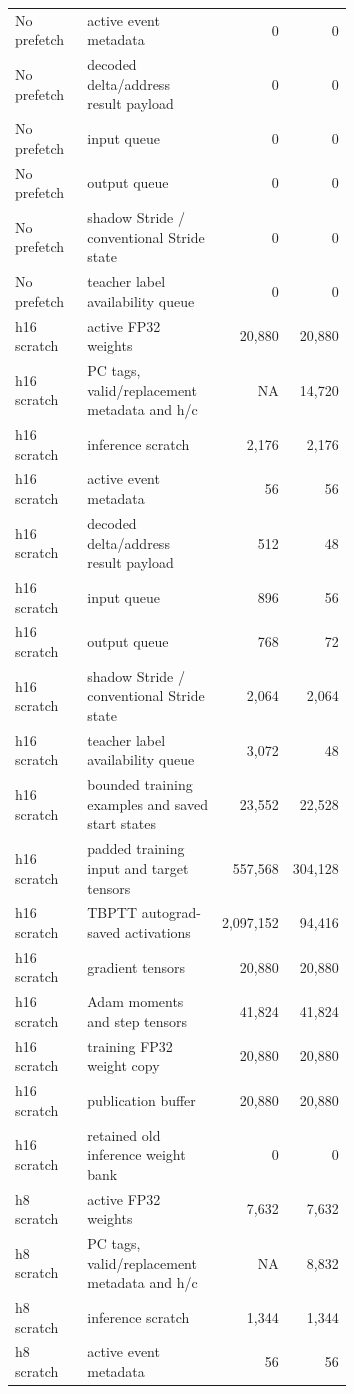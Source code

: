 \documentclass[10pt]{article}
\begin{document}
\begin{center}
\begin{longtable}{p{0.24\linewidth}p{0.43\linewidth}rr}
No prefetch & active event metadata & 0 & 0 \\
No prefetch & decoded delta/address result payload & 0 & 0 \\
No prefetch & input queue & 0 & 0 \\
No prefetch & output queue & 0 & 0 \\
No prefetch & shadow Stride / conventional Stride state & 0 & 0 \\
No prefetch & teacher label availability queue & 0 & 0 \\
h16 scratch & active FP32 weights & 20,880 & 20,880 \\
h16 scratch & PC tags, valid/replacement metadata and h/c & NA & 14,720 \\
h16 scratch & inference scratch & 2,176 & 2,176 \\
h16 scratch & active event metadata & 56 & 56 \\
h16 scratch & decoded delta/address result payload & 512 & 48 \\
h16 scratch & input queue & 896 & 56 \\
h16 scratch & output queue & 768 & 72 \\
h16 scratch & shadow Stride / conventional Stride state & 2,064 & 2,064 \\
h16 scratch & teacher label availability queue & 3,072 & 48 \\
h16 scratch & bounded training examples and saved start states & 23,552 & 22,528 \\
h16 scratch & padded training input and target tensors & 557,568 & 304,128 \\
h16 scratch & TBPTT autograd-saved activations & 2,097,152 & 94,416 \\
h16 scratch & gradient tensors & 20,880 & 20,880 \\
h16 scratch & Adam moments and step tensors & 41,824 & 41,824 \\
h16 scratch & training FP32 weight copy & 20,880 & 20,880 \\
h16 scratch & publication buffer & 20,880 & 20,880 \\
h16 scratch & retained old inference weight bank & 0 & 0 \\
h8 scratch & active FP32 weights & 7,632 & 7,632 \\
h8 scratch & PC tags, valid/replacement metadata and h/c & NA & 8,832 \\
h8 scratch & inference scratch & 1,344 & 1,344 \\
h8 scratch & active event metadata & 56 & 56 \\

\end{longtable}
\end{center}
\end{document}
